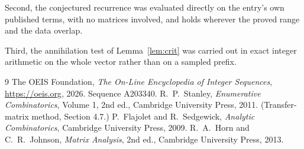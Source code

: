 \documentclass[11pt,a4paper]{article}
\theoremstyle{plain}
\theoremstyle{definition}
\begin{document}
Second, the conjectured recurrence was evaluated directly on the entry's own published terms,
with no matrices involved, and holds wherever the proved range and the data overlap.

Third, the annihilation test of Lemma~\ref{lem:crit} was carried out in exact integer
arithmetic on the whole vector rather than on a sampled prefix.

\begin{thebibliography}{9}
 The OEIS Foundation, \emph{The On-Line Encyclopedia of Integer
Sequences}, \url{https://oeis.org}, 2026. Sequence A203340.
 R.~P.~Stanley, \emph{Enumerative Combinatorics}, Volume 1, 2nd ed.,
Cambridge University Press, 2011. (Transfer-matrix method, Section 4.7.)
 P.~Flajolet and R.~Sedgewick, \emph{Analytic Combinatorics}, Cambridge
University Press, 2009.
 R.~A.~Horn and C.~R.~Johnson, \emph{Matrix Analysis}, 2nd ed., Cambridge
University Press, 2013.
\end{thebibliography}
\end{document}
